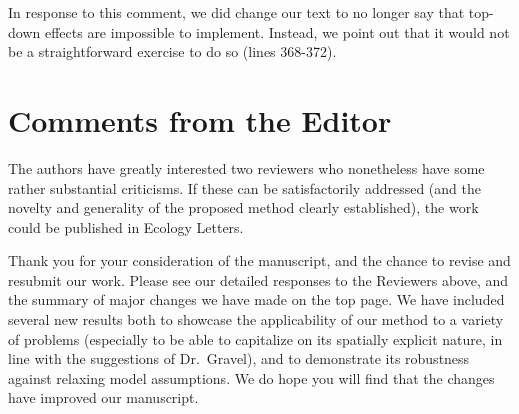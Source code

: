 \documentclass[11pt]{article}
\newcommand{\us}{\rm \setlength{\leftskip}{0.3cm} \setlength{\rightskip}{0.3cm}}
\newcommand{\them}{\it \setlength{\leftskip}{0cm} \setlength{\rightskip}{0cm}}
\begin{document}
In response to this comment, we did change our text to no longer say that top-down effects are impossible to implement. Instead, we point out that it would not be a straightforward exercise to do so (lines 368-372).

\them


\section*{Comments from the Editor}

The authors have greatly interested two reviewers who nonetheless have some rather substantial criticisms. If these can be satisfactorily addressed (and the novelty and generality of the proposed method clearly established), the work could be published in Ecology Letters.

\us

Thank you for your consideration of the manuscript, and the chance to revise and resubmit our work. Please see our detailed responses to the Reviewers above, and the summary of major changes we have made on the top page. We have included several new results both to showcase the applicability of our method to a variety of problems (especially to be able to capitalize on its spatially explicit nature, in line with the suggestions of Dr.~Gravel), and to demonstrate its robustness against relaxing model assumptions. We do hope you will find that the changes have improved our manuscript.

\them \rm




\end{document}
